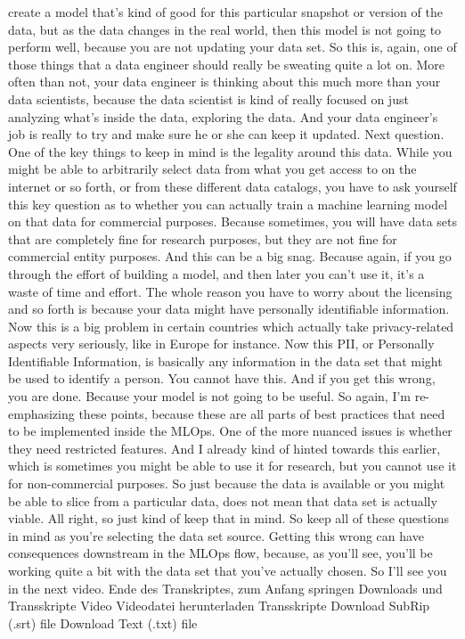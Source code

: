     create a model that's kind of good for this particular snapshot
    or version of the data, but as the data changes in the real world,
    then this model is not going to perform well, because you are not
    updating your data set.
    So this is, again, one of those things that a data engineer should really
    be sweating quite a lot on.
    More often than not, your data engineer is
    thinking about this much more than your data scientists,
    because the data scientist is kind of really focused
    on just analyzing what's inside the data, exploring the data.
    And your data engineer's job is really to try and make
    sure he or she can keep it updated.
    Next question.
    One of the key things to keep in mind is the legality around this data.
    While you might be able to arbitrarily select
    data from what you get access to on the internet or so forth,
    or from these different data catalogs, you
    have to ask yourself this key question as to whether you can actually
    train a machine learning model on that data for commercial purposes.
    Because sometimes, you will have data sets
    that are completely fine for research purposes,
    but they are not fine for commercial entity purposes.
    And this can be a big snag.
    Because again, if you go through the effort of building a model,
    and then later you can't use it, it's a waste of time and effort.
    The whole reason you have to worry about the licensing and so forth
    is because your data might have personally identifiable information.
    Now this is a big problem in certain countries
    which actually take privacy-related aspects very seriously, like in Europe
    for instance.
    Now this PII, or Personally Identifiable Information,
    is basically any information in the data set
    that might be used to identify a person.
    You cannot have this.
    And if you get this wrong, you are done.
    Because your model is not going to be useful.
    So again, I'm re-emphasizing these points,
    because these are all parts of best practices
    that need to be implemented inside the MLOps.
    One of the more nuanced issues is whether they need restricted features.
    And I already kind of hinted towards this earlier,
    which is sometimes you might be able to use it for research,
    but you cannot use it for non-commercial purposes.
    So just because the data is available or you might be able to slice
    from a particular data, does not mean that data set is actually viable.
    All right, so just kind of keep that in mind.
    So keep all of these questions in mind as you're
    selecting the data set source.
    Getting this wrong can have consequences downstream in the MLOps flow,
    because, as you'll see, you'll be working quite a bit with the data set
    that you've actually chosen.
    So I'll see you in the next video.
    Ende des Transkriptes, zum Anfang springen
    Downloads und Transskripte
    Video
    Videodatei herunterladen
    Transskripte
    Download SubRip (.srt) file
    Download Text (.txt) file         
    
